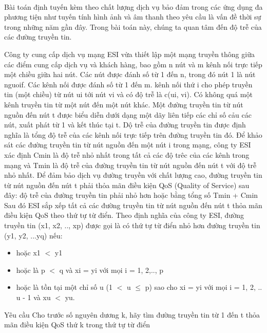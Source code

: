  

Bài toán định tuyến kèm theo chất lượng dịch vụ bảo đảm trong các ứng dụng đa phương tiện như tuyến tính hình ảnh và âm thanh theo yêu cầu là vấn đề thời sự trong những năm gần đây. Trong bài toán này, chúng ta quan tâm đến độ trễ của các đường truyền tin.

Công ty cung cấp dịch vụ mạng ESI vừa thiết lập một mạng truyền thông giữa các điểm cung cấp dịch vụ và khách hàng, bao gồm n nút và m kênh nối trực tiếp một chiều giữa hai nút. Các nút được đánh số từ 1 đến n, trong đó nút 1 là nút nguoif. Các kênh nối được đánh số từ 1 đến m. kênh nối thứ i cho phép truyền tin (một chiều) từ nút ui tới nút vi và có độ trễ là c(ui, vi). Có không quá một kênh truyền tin từ một nút đến một nút khác. Một đường truyền tin từ nút nguồn đến nút t được biểu diễn dưới dạng một dãy liên tiếp các chỉ số cảu các nút, xuất phát từ 1 và kết thúc tại t. Dộ trễ của đường truyền tin được định nghĩa là tổng độ trễ của các kênh nối trực tiếp trên đường truyền tin đó. Để khảo sát các đường truyền tin từ nút nguồn đến một nút i trong mạng, công ty ESI xác định Cmin là độ trễ nhỏ nhất trong tất cả các độ trêc của các kênh trong mạng và Tmin là độ trễ của đường truyền tin từ nút nguồn đến nút t với độ trễ nhỏ nhất. Để đảm bảo dịch vụ đường truyền với chất lượng cao, đường truyền tin từ nút nguồn đến nút t phải thỏa mãn điều kiện QoS (Quality of Service) sau đây: độ trễ của đường truyền tin phải nhỏ hơn hoặc bằng tổng số Tmin + Cmin Sau đó ESI sắp xếp tất cả các đường truyền tin từ nút nguồn đến nút t thỏa mãn điều kiện QoS theo thứ tự từ điển. Theo định nghĩa của công ty ESI, đường truyền tin (x1, x2, .., xp) được gọi là có thứ tự từ điển nhỏ hơn đường truyền tin (y1, y2, ...yq) nếu:
\begin{itemize}
	\item hoặc x1 $<$ y1
	\item hoặc là p $<$ q và xi = yi với mọi i = 1, 2,.., p
	\item hoặc là tồn tại một chỉ số u (1 $<$ u  $\le$  p) sao cho xi = yi với mọi i = 1, 2, .. u - 1 và xu $<$ yu.
\end{itemize}

Yêu cầu
Cho trước số nguyên dương k, hãy tìm đường truyền tin từ 1 đến t thỏa mãn điều kiện QoS thứ k trong thứ tự từ điển